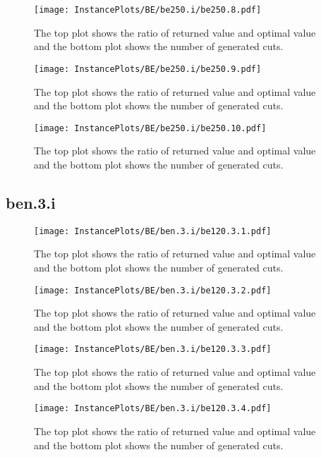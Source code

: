 \documentclass[10pt,a4paper]{article}
\begin{document}
\begin{figure}[H]
\texttt{[image: InstancePlots/BE/be250.i/be250.8.pdf]}
\caption{The top plot shows the ratio of returned value and optimal value     and the bottom plot shows the number of generated cuts.}
\end{figure}

\begin{figure}[H]
\texttt{[image: InstancePlots/BE/be250.i/be250.9.pdf]}
\caption{The top plot shows the ratio of returned value and optimal value     and the bottom plot shows the number of generated cuts.}
\end{figure}

\begin{figure}[H]
\texttt{[image: InstancePlots/BE/be250.i/be250.10.pdf]}
\caption{The top plot shows the ratio of returned value and optimal value     and the bottom plot shows the number of generated cuts.}
\end{figure}

\subsection{ben.3.i}
\begin{figure}[H]
\texttt{[image: InstancePlots/BE/ben.3.i/be120.3.1.pdf]}
\caption{The top plot shows the ratio of returned value and optimal value     and the bottom plot shows the number of generated cuts.}
\end{figure}

\begin{figure}[H]
\texttt{[image: InstancePlots/BE/ben.3.i/be120.3.2.pdf]}
\caption{The top plot shows the ratio of returned value and optimal value     and the bottom plot shows the number of generated cuts.}
\end{figure}

\begin{figure}[H]
\texttt{[image: InstancePlots/BE/ben.3.i/be120.3.3.pdf]}
\caption{The top plot shows the ratio of returned value and optimal value     and the bottom plot shows the number of generated cuts.}
\end{figure}

\begin{figure}[H]
\texttt{[image: InstancePlots/BE/ben.3.i/be120.3.4.pdf]}
\caption{The top plot shows the ratio of returned value and optimal value     and the bottom plot shows the number of generated cuts.}
\end{figure}
\end{document}
